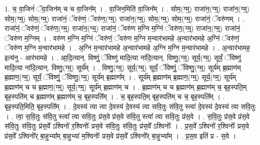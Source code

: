 \documentclass[17pt]{extarticle}
\begin{document}
1. च॒ वा॒जिनं॑ ॅवा॒जिन॑म् च च वा॒जिन᳚म् । . वा॒जिन॒मिति॑ वा॒जिन᳚म् । . सोम॒(ग्म्॒) राजा॑न॒(ग्म्॒) राजा॑न॒(ग्म्॒) सोम॒(ग्म्॒) सोम॒(ग्म्॒) राजा॑नं॒ ॅवरु॑णं॒ ॅवरु॑ण॒(ग्म्॒) राजा॑न॒(ग्म्॒) सोम॒(ग्म्॒) सोम॒(ग्म्॒) राजा॑नं॒ ॅवरु॑णम् । . राजा॑नं॒ ॅवरु॑णं॒ ॅवरु॑ण॒(ग्म्॒) राजा॑न॒(ग्म्॒) राजा॑नं॒ ॅवरु॑ण म॒ग्नि म॒ग्निं ॅवरु॑ण॒(ग्म्॒) राजा॑न॒(ग्म्॒) राजा॑नं॒ ॅवरु॑ण म॒ग्निम् । . वरु॑ण म॒ग्नि म॒ग्निं ॅवरु॑णं॒ ॅवरु॑ण म॒ग्नि म॒न्वार॑भामहे अ॒न्वार॑भामहे अ॒ग्निं ॅवरु॑णं॒ ॅवरु॑ण म॒ग्नि म॒न्वार॑भामहे । . अ॒ग्नि म॒न्वार॑भामहे अ॒न्वार॑भामहे अ॒ग्नि म॒ग्नि म॒न्वार॑भामहे । . अ॒न्वार॑भामह॒ इत्य॑नु - आर॑भामहे । . आ॒दि॒त्यान्. विष्णुं॒ ॅविष्णु॑ मादि॒त्या ना॑दि॒त्यान्. विष्णु॒(ग्म्॒) सूर्य॒(ग्म्॒) सूर्यं॒ ॅविष्णु॑ मादि॒त्या ना॑दि॒त्यान्. विष्णु॒(ग्म्॒) सूर्य᳚म् । . विष्णु॒(ग्म्॒) सूर्य॒(ग्म्॒) सूर्यं॒ ॅविष्णुं॒ ॅविष्णु॒(ग्म्॒) सूर्य॑म् ब्र॒ह्माण॑म् ब्र॒ह्माण॒(ग्म्॒) सूर्यं॒ ॅविष्णुं॒ ॅविष्णु॒(ग्म्॒) सूर्य॑म् ब्र॒ह्माण᳚म् । . सूर्य॑म् ब्र॒ह्माण॑म् ब्र॒ह्माण॒(ग्म्॒) सूर्य॒(ग्म्॒) सूर्य॑म् ब्र॒ह्माण॑म् च च ब्र॒ह्माण॒(ग्म्॒) सूर्य॒(ग्म्॒) सूर्य॑म् ब्र॒ह्माण॑म् च । . ब्र॒ह्माण॑म् च च ब्र॒ह्माण॑म् ब्र॒ह्माण॑म् च॒ बृह॒स्पति॒म् बृह॒स्पति॑म् च ब्र॒ह्माण॑म् ब्र॒ह्माण॑म् च॒ बृह॒स्पति᳚म् । . च॒ बृह॒स्पति॒म् बृह॒स्पति॑म् च च॒ बृह॒स्पति᳚म् । . बृह॒स्पति॒मिति॒ बृह॒स्पति᳚म् । . दे॒वस्य॑ त्वा त्वा दे॒वस्य॑ दे॒वस्य॑ त्वा सवि॒तुः स॑वि॒तु स्त्वा॑ दे॒वस्य॑ दे॒वस्य॑ त्वा सवि॒तुः । . त्वा॒ स॒वि॒तुः स॑वि॒तु स्त्वा᳚ त्वा सवि॒तुः प्र॑स॒वे प्र॑स॒वे स॑वि॒तु स्त्वा᳚ त्वा सवि॒तुः प्र॑स॒वे । . स॒वि॒तुः प्र॑स॒वे प्र॑स॒वे स॑वि॒तुः स॑वि॒तुः प्र॑स॒वे᳚ ऽश्विनो॑ र॒श्विनोः᳚ प्रस॒वे स॑वि॒तुः स॑वि॒तुः प्र॑स॒वे᳚ ऽश्विनोः᳚ । . प्र॒स॒वे᳚ ऽश्विनो॑ र॒श्विनोः᳚ प्रस॒वे प्र॑स॒वे᳚ ऽश्विनो᳚र् बा॒हुभ्या᳚म् बा॒हुभ्या॑ म॒श्विनोः᳚ प्रस॒वे प्र॑स॒वे᳚ ऽश्विनो᳚र् बा॒हुभ्या᳚म् । . प्र॒स॒व इति॑ प्र - स॒वे । \newline
\end{document}
